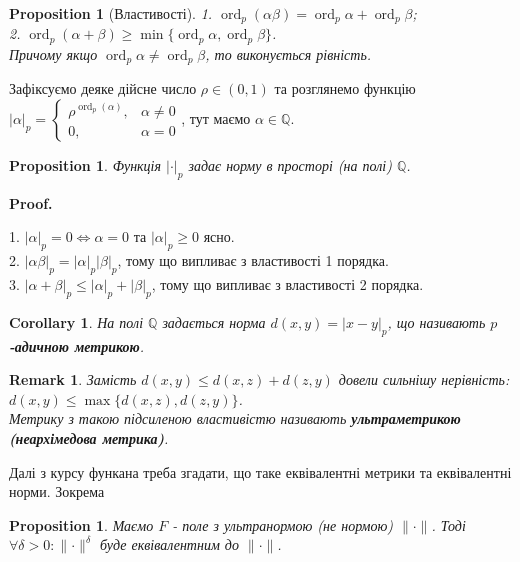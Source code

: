 \documentclass[a4paper, 14pt]{extarticle}
\makeatletter
\theoremstyle{theoremdd}
\theoremstyle{theoremdd}
\theoremstyle{theoremdd}
\theoremstyle{theoremdd}
\theoremstyle{theoremdd}
\newtheorem{proposition}[theorem]{Proposition}
\theoremstyle{theoremdd}
\newtheorem{remark}[theorem]{Remark}
\theoremstyle{theoremdd}
\theoremstyle{theoremdd}
\newtheorem{corollary}[theorem]{Corollary}
\def\qed{$\blacksquare$}
\renewenvironment{proof}[1][Proof.\\]{\par
\pushQED{\hfill \qed}%
\normalfont \topsep6\p@\@plus6\p@\relax
\trivlist
\item\relax
{\bfseries
#1\@addpunct{.}}\hspace\labelsep\ignorespaces
}{%
\popQED\endtrivlist\@endpefalse
}
\DeclareMathOperator{\ord}{ord}
\makeatother
\begin{document}
\begin{proposition}[Властивості]
1. $\ord_p (\alpha \beta) = \ord_p \alpha + \ord_p \beta$;\\
2. $\ord_p(\alpha+\beta) \geq \min \{\ord_p \alpha, \ord_p \beta\}$.\\
Причому якщо $\ord_p \alpha \neq \ord_p \beta$, то виконується рівність.
\end{proposition}

Зафіксуємо деяке дійсне число $\rho \in (0,1)$ та розглянемо функцію $|\alpha|_p = \begin{cases} \rho^{\ord_p(\alpha)} , & \alpha \neq 0 \\
0, & \alpha = 0 \end{cases}$, тут маємо $\alpha \in \mathbb{Q}$.

\begin{proposition}
Функція $|\cdot|_p$ задає норму в просторі (на полі) $\mathbb{Q}$.
\end{proposition}

\begin{proof}
1. $|\alpha|_p = 0 \iff \alpha = 0$ та $|\alpha|_p \geq 0$ ясно.\\
2. $|\alpha \beta|_p = |\alpha|_p |\beta|_p$, тому що випливає з властивості 1 порядка.\\
3. $|\alpha+\beta|_p \leq |\alpha|_p + |\beta|_p$, тому що випливає з властивості 2 порядка.
\end{proof}

\begin{corollary}
На полі $\mathbb{Q}$ задається норма $d(x,y) = |x-y|_p$, що називають \textbf{$p$-адичною метрикою}.
\end{corollary}

\begin{remark}
Замість $d(x,y) \leq d(x,z) + d(z,y)$ довели сильнішу нерівність:\\
$d(x,y) \leq \max \{ d(x,z), d(z,y)\}$.\\
Метрику з такою підсиленою властивістю називають \textbf{ультраметрикою (неархімедова метрика)}.
\end{remark}

Далі з курсу функана треба згадати, що таке еквівалентні метрики та еквівалентні норми. Зокрема

\begin{proposition}
Маємо $F$ - поле з ультранормою (не нормою) $\lVert \cdot \rVert$. Тоді $\forall \delta > 0: \lVert \cdot \rVert^\delta$ буде еквівалентним до $\lVert \cdot \rVert$.
\end{proposition}
\end{document}
